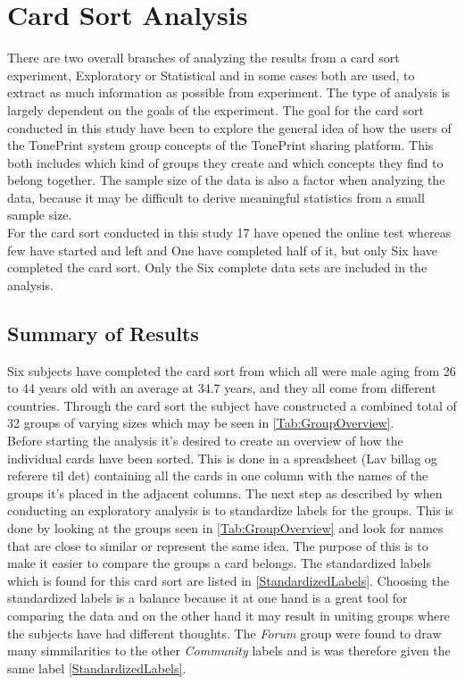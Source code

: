 \chapter{Card Sort Analysis}
\label{CardSortAnalysis}
%
There are two overall branches of analyzing the results from a card sort experiment, Exploratory or Statistical and in some cases both are used, to extract as much information as possible from experiment. The type of analysis is largely dependent on the goals of the experiment. The goal for the card sort conducted in this study have been to explore the general idea of how the users of the TonePrint system group concepts of the TonePrint sharing platform. This both includes which kind of groups they create and which concepts they find to belong together. The sample size of the data is also a factor when analyzing the data, because it may be difficult to derive meaningful statistics from a small sample size. \\
For the card sort conducted in this study 17 have opened the online test whereas few have started and left and One have completed half of it, but only Six have completed the card sort. Only the Six complete data sets are included in the analysis.

\section{Summary of Results}
\label{SummaryResults}
%
Six subjects have completed the card sort from which all were male aging from 26 to 44 years old with an average at 34.7 years, and they all come from different countries. Through the card sort the subject have constructed a combined total of 32 groups of varying sizes which may be seen in \autoref{Tab:GroupOverview}. \\ 
Before starting the analysis it's desired to create an overview of how the individual cards have been sorted. This is done in a spreadsheet (Lav billag og referere til det) containing all the cards in one column with the names of the groups it's placed in the adjacent columns. The next step as described by \textcite[184]{WEB:DonnaSpencer} when conducting an exploratory analysis is to standardize labels for the groups. This is done by looking at the groups seen in \autoref{Tab:GroupOverview} and look for names that are close to similar or represent the same idea. The purpose of this is to make it easier to compare the groups a card belongs. The standardized labels which is found for this card sort are listed in \autoref{StandardizedLabels}. Choosing the standardized labels is a balance because it at one hand is a great tool for comparing the data and on the other hand it may result in uniting groups where the subjects have had different thoughts. The \textit{Forum} group were found to draw many simmilarities to the other \textit{Community} labels and is was therefore given the same label \autoref{StandardizedLabels}. \\

